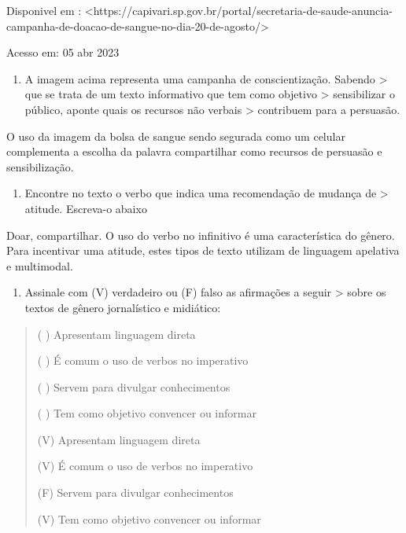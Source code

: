 {Disponivel em :
\textless https://capivari.sp.gov.br/portal/secretaria-de-saude-anuncia-campanha-de-doacao-de-sangue-no-dia-20-de-agosto/\textgreater{}

Acesso em: 05 abr 2023

\begin{enumerate}
\def\labelenumi{\arabic{enumi})}
\tightlist
\item
  A imagem acima representa uma campanha de conscientização. Sabendo
  \textgreater{} que se trata de um texto informativo que tem como
  objetivo \textgreater{} sensibilizar o público, aponte quais os
  recursos não verbais \textgreater{} contribuem para a persuasão.
\end{enumerate}

O uso da imagem da bolsa de sangue sendo segurada como um celular
complementa a escolha da palavra compartilhar como recursos de persuasão
e sensibilização.

\begin{enumerate}
\def\labelenumi{\arabic{enumi})}
\setcounter{enumi}{1}
\tightlist
\item
  Encontre no texto o verbo que indica uma recomendação de mudança de
  \textgreater{} atitude. Escreva-o abaixo
\end{enumerate}

Doar, compartilhar. O uso do verbo no infinitivo é uma característica do
gênero. Para incentivar uma atitude, estes tipos de texto utilizam de
linguagem apelativa e multimodal.

\begin{enumerate}
\def\labelenumi{\arabic{enumi})}
\setcounter{enumi}{2}
\tightlist
\item
  Assinale com (V) verdadeiro ou (F) falso as afirmações a seguir
  \textgreater{} sobre os textos de gênero jornalístico e midiático:
\end{enumerate}

\begin{quote}
( ) Apresentam linguagem direta

( ) É comum o uso de verbos no imperativo

( ) Servem para divulgar conhecimentos

( ) Tem como objetivo convencer ou informar

(V) Apresentam linguagem direta

(V) É comum o uso de verbos no imperativo

(F) Servem para divulgar conhecimentos

(V) Tem como objetivo convencer ou informar
\end{quote}

}
